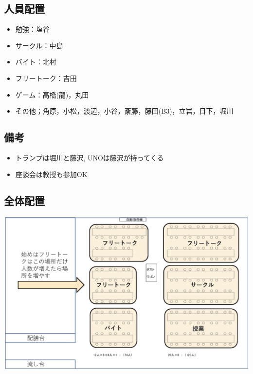 \subsection{人員配置}
\begin{itemize}
\item 勉強：塩谷
\item サークル：中島
\item バイト：北村
\item フリートーク：吉田
\item ゲーム：高橋(龍)，丸田
\item その他；角原，小松，渡辺，小谷，斎藤，藤田(B3)，立岩，日下，堀川
\end{itemize}

\subsection{備考}
\begin{itemize}
\item トランプは堀川と藤沢, UNOは藤沢が持ってくる
\item 座談会は教授も参加OK
\end{itemize}

\subsection{全体配置}
\begin{center}
\includegraphics[width=15cm]{./13/hone.eps}
\end{center}
